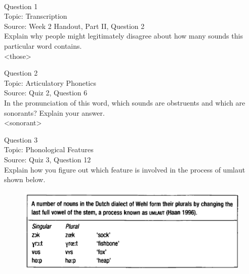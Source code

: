 \documentclass[12pt]{article}
\begin{document}
\newpage

\begin{center}
\textbf{{\color{red}{\HUGE END OF EXAM}}}\\

\end{center}
\newpage

\begin{center}
\textbf{{\color{blue}{\HUGE START OF EXAM\\}}}

\textbf{{\color{blue}{\HUGE Student ID: 35405\\}}}

\textbf{{\color{blue}{\HUGE \\}}}

\end{center}
\newpage

{\large Question 1}\\

Topic: Transcription\\
Source: Week 2 Handout, Part II, Question 2\\

Explain why people might legitimately disagree about how many sounds this particular word contains.\\

<those>


\newpage

{\large Question 2}\\

Topic: Articulatory Phonetics\\
Source: Quiz 2, Question 6\\

In the pronunciation of this word, which sounds are obstruents and which are sonorants? Explain your answer.\\

<sonorant>


\newpage

{\large Question 3}\\

Topic: Phonological Features\\
Source: Quiz 3, Question 12\\

Explain how you figure out which feature is involved in the process of umlaut shown below.\\

\begin{figure}[H]
\includegraphics{../images/dutch.png}
\end{figure}
\end{document}
